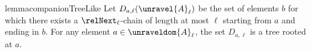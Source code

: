 \ifmainpart
\begin{restatable}{lemma}{companionTreeLike}\label{lem:companion-tree-like}
  Let $D_{a, \ell}(\unravel{A}_{\ell})$ be the set of elements $b$ for which there exists a $\relNext_{\ell}$-chain of length at most $\ell$ starting from $a$ and ending in $b$.
  For any element $a \in \unraveldom{A}_{\ell}$, the set $D_{a, \ell}$ is a tree rooted at $a$.
\end{restatable}
\fi
\ifmainpart
